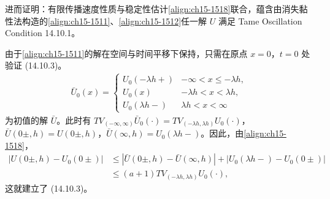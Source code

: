 \documentclass[../../main.tex]{subfiles}
\begin{document}
进而证明：有限传播速度性质与稳定性估计\eqref{align:ch15-1518}联合，蕴含由消失黏性法构造的\eqref{align:ch15-1511}、\eqref{align:ch15-1512}任一解 $U$ 满足 Tame Oscillation Condition 14.10.1。

由于\eqref{align:ch15-1511}的解在空间与时间平移下保持，只需在原点 $x=0$，$t=0$ 处验证 (14.10.3)。
\begin{align}
\bar U_0(x)=
\begin{cases}
U_0(-\lambda h+)&-\infty<x\leqslant-\lambda h,\\
U_0(x)&-\lambda h<x<\lambda h,\\
U_0(\lambda h-)&\lambda h<x<\infty
\end{cases}
\label{align:ch15-15812}
\end{align}
为初值的解 $\bar U$。此时有 $TV_{(-\infty,\infty)}\bar U_0(\cdot)=TV_{(-\lambda h,\lambda h)}U_0(\cdot)$，$\bar U(0\pm,h)=U(0\pm,h)$，$\bar U(\infty,h)=U_0(\lambda h-)$。因此，由\eqref{align:ch15-1518}，
\begin{align}
|U(0\pm,h)-U_0(0\pm)|&\leqslant|\bar U(0\pm,h)-\bar U(\infty,h)|+|U_0(\lambda h-)-U_0(0\pm)|\nonumber\\
&\leqslant(a+1)TV_{(-\lambda h,\lambda h)}U_0(\cdot),
\label{align:ch15-15813}
\end{align}
这就建立了 (14.10.3)。
\end{document}
